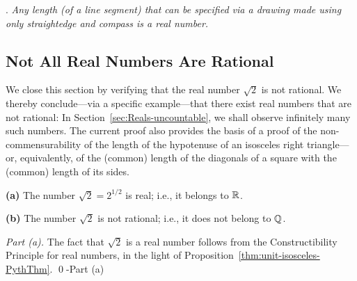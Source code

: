 \medskip

.  {\em Any length (of a line segment) that can be specified via a drawing made using only straightedge and compass is a real number.}


\subsection{Not All Real Numbers Are Rational}
\label{sec:Real-vs-Rational}

We close this section by verifying that the real number $\sqrt{2}$ is not rational.  We thereby conclude---via a specific example---that there exist real numbers that are not rational: In
Section~\ref{sec:Reals-uncountable}, we shall observe infinitely many such numbers.  The current proof also provides the basis of a proof of the non-commensurability of the length of the hypotenuse of an isosceles right triangle---or, equivalently, of the (common) length of the diagonals of a square with the (common) length of its sides.
 

\begin{prop}
\label{thm:sqrt(2)}
{\bf (a)}
The number $\sqrt{2} = 2^{1/2}$ is real; i.e., it belongs to $\mathbb{R}$.

{\bf (b)}
The number $\sqrt{2}$ is not rational; i.e., it does not belong to $\mathbb{Q}$.
\end{prop}

\begin{proof}[Part (a)]
The fact that $\sqrt{2}$ is a real number follows from the Constructibility Principle for real numbers, in the light of Proposition~\ref{thm:unit-isosceles-PythThm}.  \qed-Part (a)
\end{proof}

\medskip


